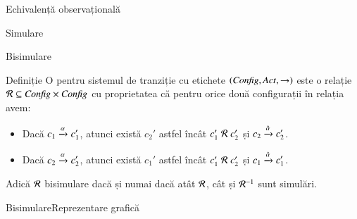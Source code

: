 \documentclass[xcolor=pdftex,romanian,colorlinks]{beamer}
\begin{document}
\begin{section}{Echivalență observațională}
\begin{subsection}{Simulare}
\end{subsection}
\begin{subsection}{Bisimulare}
\begin{frame}{}
\begin{block}{Definiție}
O  pentru sistemul de tranziție cu etichete $({\it Config}, {\it Act}, \rightarrow)$ este o relație ${\cal R} \subseteq {\it Config} \times {\it Config}$ cu proprietatea că pentru orice două configurații în relația  avem:
\begin{itemize}
\item  
Dacă $\Ss[\alpha]{c_1}{c_1'}$, atunci există $c_2'$ astfel încât $c_1' \mathrel{\cal R} c_2'$ și $\Ss[\hat{\alpha}]{c_2}{c_2'}$. 
\item  
Dacă $\Ss[\alpha]{c_2}{c_2'}$, atunci există $c_1'$ astfel încât  $c_1' \mathrel{\cal R} c_2'$ și $\Ss[\hat{\alpha}]{c_1}{c_1'}$. 
\end{itemize}

Adică ${\cal R}$ bisimulare dacă și numai dacă atât ${\cal R}$, cât și ${\cal R}^{-1}$ sunt simulări. 
\end{block}
\end{frame}



\begin{frame}{Bisimulare}{Reprezentare grafică}

\hfill\begin{minipage}{.3\columnwidth}


\end{minipage}
\end{frame}
\end{subsection}
\end{section}
\end{document}
